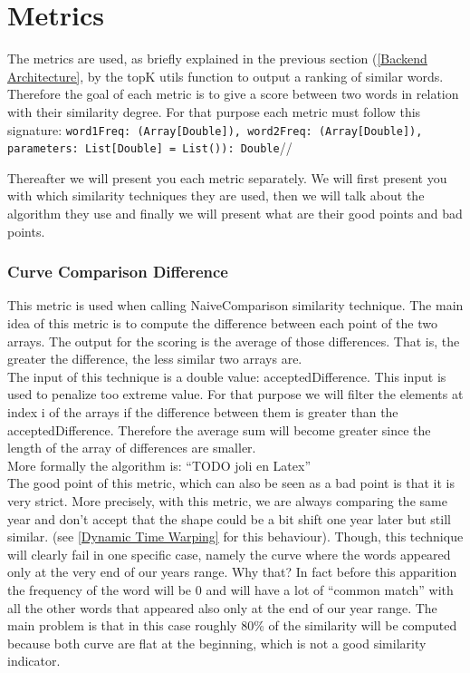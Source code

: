 \documentclass{article}
\begin{document}
\section{Metrics}

The metrics are used, as briefly explained in the previous section (\ref{Backend Architecture}, by the topK utils function to output a ranking of similar words. Therefore the goal of each metric is to give a score between two words in relation with their similarity degree. For that purpose each metric must follow this signature: \texttt{word1Freq: (Array[Double]), word2Freq: (Array[Double]), parameters: List[Double] = List()): Double}//

Thereafter we will present you each metric separately. We will first present you with which similarity techniques they are used, then we will talk about the algorithm they use and finally we will present what are their good points and bad points.


\subsubsection{Curve Comparison Difference}

This metric is used when calling NaiveComparison similarity technique. The main idea of this metric is to compute the difference between each point of the two arrays. The output for the scoring is the average of those differences. That is, the greater the difference, the less similar two arrays are. \\

The input of this technique is a double value: acceptedDifference. This input is used to penalize too extreme value. For that purpose we will filter the elements at index i of the arrays if the difference between them is greater than the acceptedDifference. Therefore the average sum will become greater since the length of the array of differences are smaller.\\

More formally the algorithm is: “TODO joli en Latex”\\

The good point of this metric, which can also be seen as a bad point is that it is very strict. More precisely, with this metric, we are always comparing the same year and don’t accept that the shape could be a bit shift one year later but still similar. (see \ref{Dynamic Time Warping} for this behaviour). Though, this technique will clearly fail in one specific case, namely the curve where the words appeared only at the very end of our years range. Why that? In fact before this apparition the frequency of the word will be 0 and will have a lot of “common match” with all the other words that appeared also only at the end of our year range. The main problem is that in this case roughly 80\% of the similarity will be computed because both curve are flat at the beginning, which is not a good similarity indicator.
\end{document}
